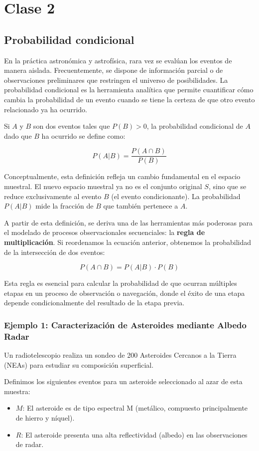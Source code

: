 \chapter{Clase 2}

\section{Probabilidad condicional}

En la práctica astronómica y astrofísica, rara vez se evalúan los eventos de manera aislada. Frecuentemente, se dispone de información parcial o de observaciones preliminares que restringen el universo de posibilidades. La probabilidad condicional es la herramienta analítica que permite cuantificar cómo cambia la probabilidad de un evento cuando se tiene la certeza de que otro evento relacionado ya ha ocurrido. 

Si $A$ y $B$ son dos eventos tales que $P(B) > 0$, la probabilidad condicional de $A$ dado que $B$ ha ocurrido se define como:

$$ P(A|B) = \frac{P(A \cap B)}{P(B)} $$

Conceptualmente, esta definición refleja un cambio fundamental en el espacio muestral. El nuevo espacio muestral ya no es el conjunto original $S$, sino que se reduce exclusivamente al evento $B$ (el evento condicionante). La probabilidad $P(A|B)$ mide la fracción de $B$ que también pertenece a $A$. 

A partir de esta definición, se deriva una de las herramientas más poderosas para el modelado de procesos observacionales secuenciales: la \textbf{regla de multiplicación}. Si reordenamos la ecuación anterior, obtenemos la probabilidad de la intersección de dos eventos:

$$ P(A \cap B) = P(A|B) \cdot P(B) $$

Esta regla es esencial para calcular la probabilidad de que ocurran múltiples etapas en un proceso de observación o navegación, donde el éxito de una etapa depende condicionalmente del resultado de la etapa previa.

\subsection{Ejemplo 1: Caracterización de Asteroides mediante Albedo Radar}

Un radiotelescopio realiza un sondeo de 200 Asteroides Cercanos a la Tierra (NEAs) para estudiar su composición superficial. 

Definimos los siguientes eventos para un asteroide seleccionado al azar de esta muestra:
\begin{itemize}
    \item $M$: El asteroide es de tipo espectral M (metálico, compuesto principalmente de hierro y níquel).
    \item $R$: El asteroide presenta una alta reflectividad (albedo) en las observaciones de radar.
\end{itemize}

